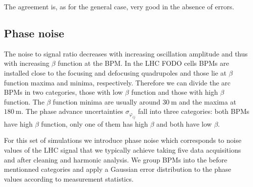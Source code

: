 The agreement is, as for the general case, very good in the absence of errors.

\subsection{Phase noise}

The noise to signal ratio decreases with increasing oscillation amplitude and thus with increasing
$\beta$ function at the BPM. In the LHC FODO cells BPMs are installed close to the focusing and
defocusing quadrupoles and those lie at $\beta$ function maxima and minima, respectively.
Therefore we can divide the arc BPMs in two categories, those with low $\beta$ function and those with
high $\beta$ function. The $\beta$ function minima are usually around $\SI{30}{\meter}$ and the
maxima at $\SI{180}{\meter}$.
The phase advance uncertainties $\sigma_{\varphi_{ij}}$ fall into three categories:
both BPMs have high $\beta$ function, only one of them has high $\beta$ and both have low $\beta$.

For this set of simulations we introduce phase noise which
corresponds to noise values of the LHC signal that we typically achieve taking five data acquisitions
and after cleaning \cite{Calaga2004} and harmonic analysis.
We group BPMs into the before mentionned categories and apply a Gaussian error distribution
to the phase values according to measurement statistics.

